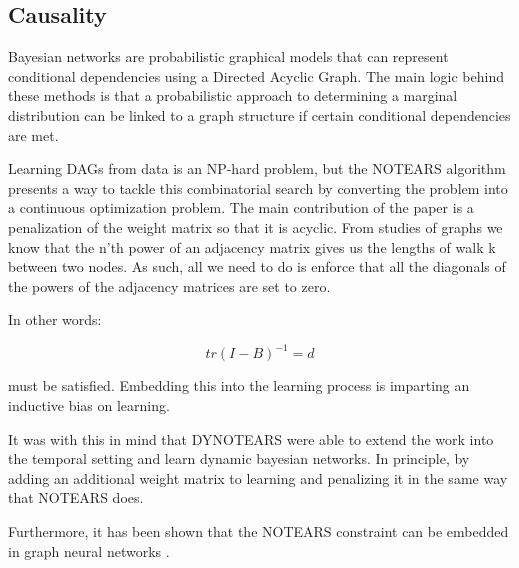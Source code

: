 \documentclass{article}
\begin{document}

\subsection{Causality}

Bayesian networks are probabilistic graphical models that can represent conditional dependencies using a Directed Acyclic Graph. The main logic behind these methods is that a probabilistic approach to determining a marginal distribution can be linked to a graph structure if certain conditional dependencies are met. 

Learning DAGs from data is an NP-hard problem, but the NOTEARS algorithm \cite{zheng_dags_2018} presents a way to tackle this combinatorial search by converting the problem into a continuous optimization problem. The main contribution of the paper is a penalization of the weight matrix so that it is acyclic. From studies of graphs we know that the n'th power of an adjacency matrix gives us the lengths of walk k between two nodes. As such, all we need to do is enforce that all the diagonals of the powers of the adjacency matrices are set to zero. 

In other words:

$$ tr(I-B)^{-1} = d $$

must be satisfied. Embedding this into the learning process is imparting an inductive bias on learning. 

It was with this in mind that DYNOTEARS \cite{pamfil_dynotears_2020} were able to extend the work into the temporal setting and learn dynamic bayesian networks. In principle, by adding an additional weight matrix to learning and penalizing it in the same way that NOTEARS does.

Furthermore, it has been shown that the NOTEARS constraint can be embedded in graph neural networks \cite{lachapelle_gradient-based_2020,yu_dag-gnn_nodate}.
\end{document}
